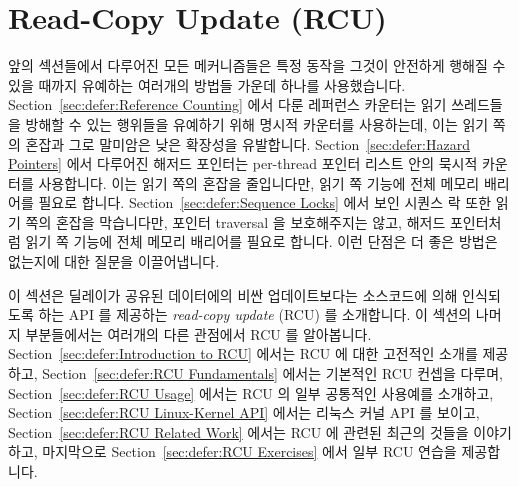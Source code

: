 
\section{Read-Copy Update (RCU)}
\label{sec:defer:Read-Copy Update (RCU)}

앞의 섹션들에서 다루어진 모든 메커니즘들은 특정 동작을 그것이 안전하게 행해질
수 있을 때까지 유예하는 여러개의 방법들 가운데 하나를 사용했습니다.
Section~\ref{sec:defer:Reference Counting} 에서 다룬 레퍼런스 카운터는 읽기
쓰레드들을 방해할 수 있는 행위들을 유예하기 위해 명시적 카운터를 사용하는데,
이는 읽기 쪽의 혼잡과 그로 말미암은 낮은 확장성을 유발합니다.
Section~\ref{sec:defer:Hazard Pointers} 에서 다루어진 해저드 포인터는
per-thread 포인터 리스트 안의 묵시적 카운터를 사용합니다.
이는 읽기 쪽의 혼잡을 줄입니다만, 읽기 쪽 기능에 전체 메모리 배리어를 필요로
합니다.
Section~\ref{sec:defer:Sequence Locks} 에서 보인 시퀀스 락 또한 읽기 쪽의
혼잡을 막습니다만, 포인터 traversal 을 보호해주지는 않고, 해저드 포인터처럼
읽기 쪽 기능에 전체 메모리 배리어를 필요로 합니다.
이런 단점은 더 좋은 방법은 없는지에 대한 질문을 이끌어냅니다.
\iffalse

All of the mechanisms discussed in the preceding sections
used one of a number of approaches to defer specific actions
until they may be carried out safely.
The reference counters discussed in
Section~\ref{sec:defer:Reference Counting}
use explicit counters to defer actions that could disturb readers,
which results in read-side contention and thus poor scalability.
The hazard pointers covered by
Section~\ref{sec:defer:Hazard Pointers}
uses implicit counters in the guise of per-thread lists of pointer.
This avoids read-side contention, but requires
full memory barriers in read-side primitives.
The sequence lock presented in
Section~\ref{sec:defer:Sequence Locks}
also avoids read-side contention, but does not protect pointer
traversals and, like hazard pointers, requires full memory barriers
in read-side primitives.
These schemes' shortcomings raise the question of
whether it is possible to do better.
\fi

이 섹션은 딜레이가 공유된 데이터에의 비싼 업데이트보다는 소스코드에 의해
인식되도록 하는 API 를 제공하는 \emph{read-copy update} (RCU) 를 소개합니다.
이 섹션의 나머지 부분들에서는 여러개의 다른 관점에서 RCU 를 알아봅니다.
Section~\ref{sec:defer:Introduction to RCU} 에서는 RCU 에 대한 고전적인 소개를
제공하고,
Section~\ref{sec:defer:RCU Fundamentals} 에서는 기본적인 RCU 컨셉을 다루며,
Section~\ref{sec:defer:RCU Usage} 에서는 RCU 의 일부 공통적인 사용예를
소개하고,
Section~\ref{sec:defer:RCU Linux-Kernel API} 에서는 리눅스 커널 API 를 보이고,
Section~\ref{sec:defer:RCU Related Work} 에서는 RCU 에 관련된 최근의 것들을
이야기하고, 마지막으로
Section~\ref{sec:defer:RCU Exercises} 에서 일부 RCU 연습을 제공합니다.
\iffalse


